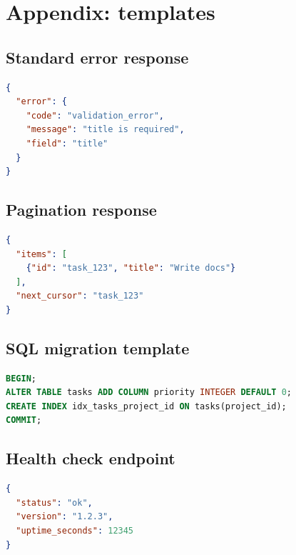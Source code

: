 \chapter{Appendix: templates}

\section{Standard error response}
\begin{lstlisting}[language=JSON]
{
  "error": {
    "code": "validation_error",
    "message": "title is required",
    "field": "title"
  }
}
\end{lstlisting}

\section{Pagination response}
\begin{lstlisting}[language=JSON]
{
  "items": [
    {"id": "task_123", "title": "Write docs"}
  ],
  "next_cursor": "task_123"
}
\end{lstlisting}

\section{SQL migration template}
\begin{lstlisting}[language=SQL]
BEGIN;
ALTER TABLE tasks ADD COLUMN priority INTEGER DEFAULT 0;
CREATE INDEX idx_tasks_project_id ON tasks(project_id);
COMMIT;
\end{lstlisting}

\section{Health check endpoint}
\begin{lstlisting}[language=JSON]
{
  "status": "ok",
  "version": "1.2.3",
  "uptime_seconds": 12345
}
\end{lstlisting}
